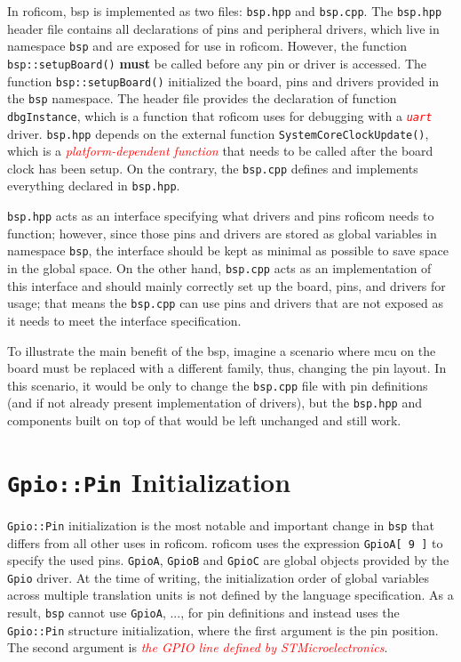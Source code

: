 \documentclass[
  digital,     %
  oneside,     %
  nosansbold,  %
  nocolorbold, %
  nolof,         %
  nolot,         %
]{fithesis4}
\newcommand{\TODO}[1]{\textcolor{red}{\textit{#1}}}
\begin{document}
{{{In \acrshort{roficom}, \acrshort{bsp} is implemented as two files: \verb|bsp.hpp| and \verb|bsp.cpp|. The \verb|bsp.hpp| header file contains all declarations of pins and peripheral drivers, which live in namespace \lstinline{bsp} and are exposed for use in \acrshort{roficom}. However, the function \lstinline{bsp::setupBoard()} \textbf{must} be called before any pin or driver is accessed. The function \lstinline{bsp::setupBoard()} initialized the board, pins and drivers provided in the \lstinline{bsp} namespace. The header file provides the declaration of function \lstinline{dbgInstance}, which is a function that \acrshort{roficom} uses for debugging with a \TODO{ \texttt{uart} } driver. \verb|bsp.hpp| depends on the external function \lstinline|SystemCoreClockUpdate()|, which is a \TODO{platform-dependent function} that needs to be called after the board clock has been setup. On the contrary, the \verb|bsp.cpp| defines and implements everything declared in \verb|bsp.hpp|. 

\verb|bsp.hpp| acts as an interface specifying what drivers and pins \acrshort{roficom} needs to function; however, since those pins and drivers are stored as global variables in namespace \lstinline{bsp}, the interface should be kept as minimal as possible to save space in the global space. On the other hand, \verb|bsp.cpp| acts as an implementation of this interface and should mainly correctly set up the board, pins, and drivers for usage; that means the \verb|bsp.cpp| can use pins and drivers that are not exposed as it needs to meet the interface specification.

To illustrate the main benefit of the \acrshort{bsp}, imagine a scenario where \acrshort{mcu} on the board must be replaced with a different family, thus, changing the pin layout. In this scenario, it would be only to change the \verb|bsp.cpp| file with pin definitions (and if not already present implementation of drivers), but the \verb|bsp.hpp| and components built on top of that would be left unchanged and still work.

\section[ Gpio::Pin Initialization ]{ \lstinline|Gpio::Pin| Initialization }
\lstinline{Gpio::Pin} initialization is the most notable and important change in \lstinline{bsp} that differs from all other uses in \acrshort{roficom}. \acrshort{roficom} uses the expression \lstinline{GpioA[ 9 ]} to specify the used pins. \lstinline{GpioA}, \lstinline{GpioB} and \lstinline{GpioC} are global objects provided by the \lstinline{Gpio} driver. At the time of writing, the initialization order of global variables across multiple translation units is not defined by the language specification. As a result, \lstinline{bsp} cannot use \lstinline{GpioA}, ..., for pin definitions and instead uses the \lstinline{Gpio::Pin} structure initialization, where the first argument is the pin position. The second argument is \TODO{the GPIO line defined by STMicroelectronics}.

}}}
\end{document}
